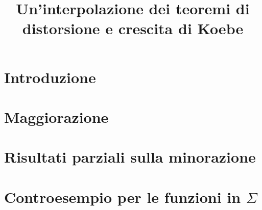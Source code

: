 \documentclass{article}
\title{Un'interpolazione dei teoremi di distorsione e crescita di Koebe}
\author{}
\date{}
\begin{document}
\maketitle
\newpage
\tableofcontents
\newpage


\section*{Introduzione}


\newpage

\section{Maggiorazione}


\newpage

\section{Risultati parziali sulla minorazione}


\newpage

\section{Controesempio per le funzioni in $\Sigma$}


\newpage


\end{document}
